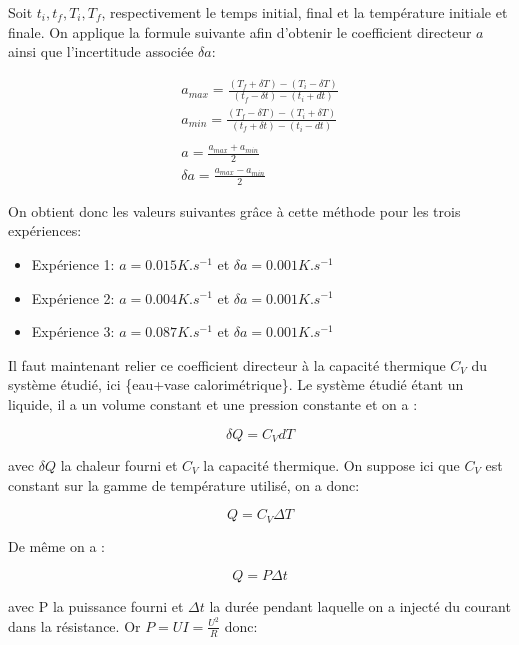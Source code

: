 \documentclass[12pt]{article}
\begin{document}
Soit $t_i, t_f, T_i, T_f$, respectivement le temps initial, final et la température initiale et finale. On applique la formule suivante afin d'obtenir le coefficient directeur $a$ ainsi que l'incertitude associée $\delta a$:

\begin{gather*}
	a_{max} = \frac{(T_f + \delta T) - (T_i - \delta T)}{(t_f - \delta t) - (t_i + dt)} \\
	a_{min} = \frac{(T_f - \delta T) - (T_i + \delta T)}{(t_f + \delta t) - (t_i - dt)} \\
	\\
	a = \frac{a_{max} + a_{min}}{2} \\
	\delta a = \frac{a_{max} - a_{min}}{2}
\end{gather*}

On obtient donc les valeurs suivantes grâce à cette méthode pour les trois expériences:
\begin{itemize}
	\item Expérience 1: $a = 0.015 K.s^{-1}$ et $\delta a = 0.001 K.s^{-1}$
	\item Expérience 2: $a = 0.004 K.s^{-1}$ et $\delta a = 0.001 K.s^{-1}$
	\item Expérience 3: $a = 0.087 K.s^{-1}$ et $\delta a = 0.001 K.s^{-1}$
\end{itemize}

\newpage
Il faut maintenant relier ce coefficient directeur à la capacité thermique $C_V$ du système étudié, ici \{eau+vase calorimétrique\}.
Le système étudié étant un liquide, il a un volume constant et une pression constante et on a :

\begin{equation}
\delta Q=C_VdT
\end{equation}

avec $\delta Q$ la chaleur fourni et $C_V$ la capacité thermique. On suppose ici que $C_V$ est constant sur la gamme de température utilisé, on a donc:

\begin{equation}
Q=C_V\Delta T
\end{equation}

De même on a :

\begin{equation}
Q=P\Delta t
\end{equation}

avec P la puissance fourni et $\Delta t$ la durée pendant laquelle on a injecté du courant dans la résistance. Or $P=UI=\frac{U^2}{R}$ donc:
\end{document}
